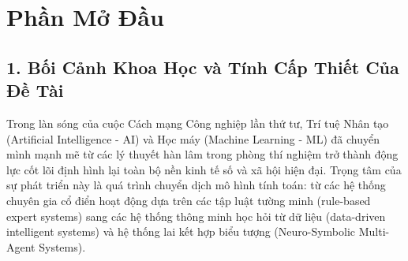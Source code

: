 \documentclass[12pt,a4paper]{report}
\begin{document}
\tableofcontents
\newpage
\listoffigures
\newpage
\listoftables
\newpage
\lstlistoflistings
\newpage

\chapter*{Phần Mở Đầu}

\section*{1. Bối Cảnh Khoa Học và Tính Cấp Thiết Của Đề Tài}

Trong làn sóng của cuộc Cách mạng Công nghiệp lần thứ tư, Trí tuệ Nhân tạo (Artificial Intelligence - AI) và Học máy (Machine Learning - ML) đã chuyển mình mạnh mẽ từ các lý thuyết hàn lâm trong phòng thí nghiệm trở thành động lực cốt lõi định hình lại toàn bộ nền kinh tế số và xã hội hiện đại. Trọng tâm của sự phát triển này là quá trình chuyển dịch mô hình tính toán: từ các hệ thống chuyên gia cổ điển hoạt động dựa trên các tập luật tường minh (rule-based expert systems) sang các hệ thống thông minh học hỏi từ dữ liệu (data-driven intelligent systems) và hệ thống lai kết hợp biểu tượng (Neuro-Symbolic Multi-Agent Systems).
\end{document}
